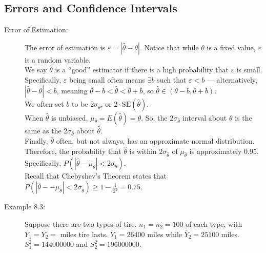 \documentclass[10pt]{extarticle}
\begin{document}
  \subsection{Errors and Confidence Intervals}%
  \begin{description}
    \item[Error of Estimation:] The error of estimation is $\varepsilon = |\hat{\theta} - \theta|$. Notice that while $\theta$ is a fixed value, $\varepsilon$ is a random variable.\\

      We say $\hat{\theta}$ is a ``good'' estimator if there is a high probability that $\varepsilon$ is small. Specifically, $\varepsilon$ being small often means $\exists b$ such that $\varepsilon < b$ --- alternatively, $|\hat{\theta} - \theta| < b$, meaning $\theta -b < \hat{\theta} < \theta + b$, so $\hat{\theta}\in (\theta-b,\theta + b)$.\\

      We often set $b$ to be $2\sigma_{\hat{\theta}}$, or $2\cdot\text{SE}(\hat{\theta})$.\\

      When $\hat{\theta}$ is unbiased, $\mu_{\hat{\theta}} = E(\hat{\theta}) = \theta$. So, the $2\sigma_{\hat{\theta}}$ interval about $\theta$ is the same as the $2\sigma_{\hat{\theta}}$ about $\hat{\theta}$.\\

      Finally, $\hat{\theta}$ often, but not always, has an approximate normal distribution. Therefore, the probability that $\hat{\theta}$ is within $2\sigma_{\hat{\theta}}$ of $\mu_{\hat{\theta}}$ is approximately 0.95. Specifically, $P(|\hat{\theta} - \mu_{\hat{\theta}}| < 2\sigma_{\hat{\theta}})$.\\

      Recall that Chebyshev's Theorem states that $P(|\hat{\theta} - -\mu_{\hat{\theta}}| < 2\sigma_{\hat{\theta}}) \geq 1-\frac{1}{2^2} = 0.75$.
    \item[Example 8.3:] Suppose there are two types of tire. $n_1 = n_2 = 100$ of each type, with $Y_1 = Y_2 = $ miles tire lasts. $\overline{Y}_{1} = 26400$ miles while $\overline{Y}_2 = 25100$ miles. $S^2_{1} = 144000000$ and $S_2^{2} = 196000000$.\\


\end{description}
\end{document}
